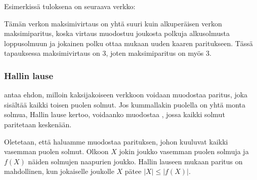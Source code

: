 Esimerkissä tuloksena on seuraava verkko:

\begin{center}
\end{center}

Tämän verkon maksimivirtaus on yhtä suuri kuin
alkuperäisen verkon maksimiparitus,
koska virtaus muodostuu joukosta polkuja
alkusolmusta loppusolmuun ja jokainen
polku ottaa mukaan uuden kaaren paritukseen.
Tässä tapauksessa maksimivirtaus on 3,
joten maksimiparitus on myös 3.

\subsubsection{Hallin lause}


 antaa ehdon, milloin kaksijakoiseen
verkkoon voidaan muodostaa paritus,
joka sisältää kaikki toisen puolen solmut.
Jos kummallakin puolella on yhtä monta solmua,
Hallin lause kertoo, voidaanko muodostaa
,
jossa kaikki solmut paritetaan keskenään.

Oletetaan, että haluamme muodostaa parituksen,
johon kuuluvat kaikki vasemman puolen solmut.
Olkoon $X$ jokin joukko vasemman puolen solmuja
ja $f(X)$ näiden solmujen naapurien joukko.
Hallin lauseen mukaan paritus on mahdollinen,
kun jokaiselle joukolle $X$
pätee $|X| \le |f(X)|$.

